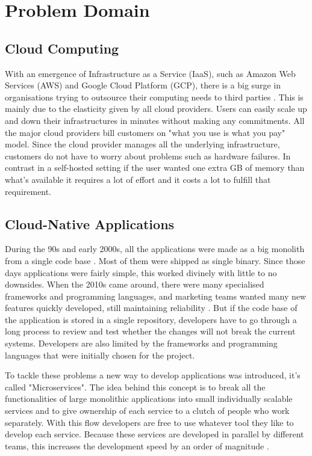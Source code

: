 \section{Problem Domain}

\subsection{Cloud Computing}
With an emergence of Infrastructure as a Service (IaaS), such as Amazon Web Services (AWS) and Google Cloud Platform (GCP), there is a big surge in organisations trying to outsource their computing needs to third parties \citep{rimol_2021}. This is mainly due to the elasticity given by all cloud providers. Users can easily scale up and down their infrastructures in minutes without making any commitments. All the major cloud providers bill customers on "what you use is what you pay" model. Since the cloud provider manages all the underlying infrastructure, customers do not have to worry about problems such as hardware failures. In contrast in a self-hosted setting if the user wanted one extra GB of memory than what's available it requires a lot of effort and it costs a lot to fulfill that requirement.

\subsection{Cloud-Native Applications}
During the 90s and early 2000s, all the applications were made as a big monolith from a single code base \citep{LessonsF52:online}. Most of them were shipped as single binary. Since those days applications were fairly simple, this worked divinely with little to no downsides. When the 2010s came around, there were many specialised frameworks and programming languages, and marketing teams wanted many new features quickly developed, still maintaining reliability \citep{di2018migrating,Microser52:online}. But if the code base of the application is stored in a single repository, developers have to go through a long process to review and test whether the changes will not break the current systems. Developers are also limited by the frameworks and programming languages that were initially chosen for the project.

To tackle these problems a new way to develop applications was introduced, it's called "Microservices". The idea behind this concept is to break all the functionalities of large monolithic applications into small individually scalable services and to give ownership of each service to a clutch of people who work separately. With this flow developers are free to use whatever tool they like to develop each service. Because these services are developed in parallel by different teams, this increases the development speed by an order of magnitude \citep{Understa56:online}.

